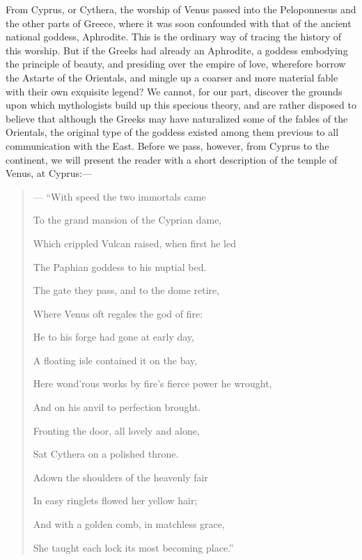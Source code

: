\documentclass[a4paper, 11pt, oneside, polutonikogreek, english]{article}
\begin{document}
From Cyprus, or Cythera, the worship of Venus passed into the Peloponnesus and the other parts of Greece, where it was soon confounded with that of the ancient national goddess, Aphrodite. This is the ordinary way of tracing the history of this worship. But if the Greeks had already an Aphrodite, a goddess embodying the principle of beauty, and presiding over the empire of love, wherefore borrow the Astarte of the Orientals, and mingle up a coarser and more material fable with their own exquisite legend? We cannot, for our part, discover the grounds upon which mythologists build up this specious theory, and are rather disposed to believe that although the Greeks may have naturalized some of the fables of the Orientals, the original type of the goddess existed among them previous to all communication with the East. Before we pass, however, from Cyprus to the continent, we will present the reader with a short description of the temple of Venus, at Cyprus:--- 
\begin{quotation}
--- ``With speed the two immortals came

To the grand mansion of the Cyprian dame,

Which crippled Vulcan raised, when first he led

The Paphian goddess to his nuptial bed.

The gate they pass, and to the dome retire,

Where Venus oft regales the god of fire:

He to his forge had gone at early day,

A floating isle contained it on the bay,

Here wond'rous works by fire's fierce power he wrought,

And on his anvil to perfection brought.

Fronting the door, all lovely and alone,

Sat Cythera on a polished throne.

Adown the shoulders of the heavenly fair

In easy ringlets flowed her yellow hair;

And with a golden comb, in matchless grace,

She taught each lock its most becoming place.''
\end{quotation}
\end{document}
